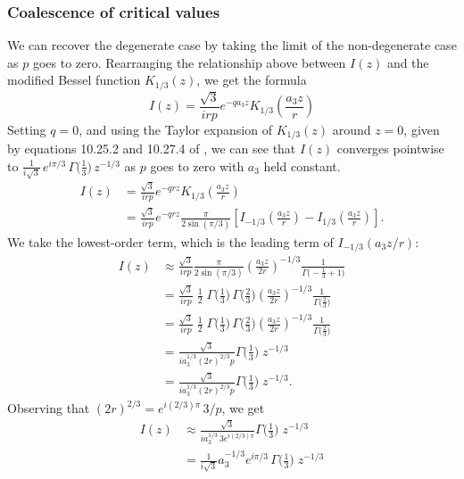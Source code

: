 \documentclass{article}
\theoremstyle{definition}
\theoremstyle{plain}
\newenvironment{verify}{\color{ForestGreen}}{\color{black}}
\begin{document}
\subsubsection{Coalescence of critical values}
We can recover the degenerate case by taking the limit of the non-degenerate case as $p$ goes to zero. Rearranging the relationship above between $I(z)$ and the modified Bessel function $K_{1/3}(z)$, we get the formula
\[ I(z) = \frac{\sqrt{3}}{irp} e^{-qa_3z} K_{1/3}\left(\frac{a_3 z}{r}\right) \]
Setting $q=0$, and using the Taylor expansion of $K_{1/3}(z)$ around $z = 0$, given by equations 10.25.2 and 10.27.4 of \cite{dlmf}, we can see that $I(z)$ converges pointwise to $\tfrac{1}{i\sqrt{3}}\,e^{i\pi/3}\,\Gamma\big(\tfrac{1}{3}\big)\,z^{-1/3}$ as $p$ goes to zero with $a_3$ held constant.
\begin{verify}
\begin{align*}
I(z) & = \frac{\sqrt{3}}{irp} e^{-qrz} K_{1/3}\left(\frac{a_3 z}{r}\right) \\
& = \frac{\sqrt{3}}{irp} e^{-qrz} \frac{\pi}{2 \sin(\pi/3)} \left[ I_{-1/3}\left(\frac{a_3 z}{r}\right) - I_{1/3}\left(\frac{a_3 z}{r} \right)\right].
\end{align*}
We take the lowest-order term, which is the leading term of $I_{-1/3}(a_3 z / r)$:
\begin{align*}
I(z) & \approx \frac{\sqrt{3}}{irp} \frac{\pi}{2 \sin(\pi/3)} \left(\frac{a_3 z}{2r}\right)^{-1/3} \frac{1}{\Gamma\big(-\tfrac{1}{3} + 1\big)} \\
& = \frac{\sqrt{3}}{irp}\;\frac{1}{2}\;\Gamma\big(\tfrac{1}{3}\big)\,\Gamma\big(\tfrac{2}{3}\big) \left(\frac{a_3 z}{2r}\right)^{-1/3} \frac{1}{\Gamma\big(\tfrac{2}{3}\big)} \\
& = \frac{\sqrt{3}}{irp}\;\frac{1}{2}\;\Gamma\big(\tfrac{1}{3}\big)\,\Gamma\big(\tfrac{2}{3}\big) \left(\frac{a_3 z}{2r}\right)^{-1/3} \frac{1}{\Gamma\big(\tfrac{2}{3}\big)} \\
& = \frac{\sqrt{3}}{i a_3^{1/3} (2r)^{2/3} p} \Gamma\big(\tfrac{1}{3}\big)\;z^{-1/3} \\
& = \frac{\sqrt{3}}{i a_3^{1/3} (2r)^{2/3} p} \Gamma\big(\tfrac{1}{3}\big)\;z^{-1/3}.
\end{align*}
Observing that $(2r)^{2/3} = e^{i(2/3)\pi }\,3/p$, we get
\begin{align*}
I(z) & \approx \frac{\sqrt{3}}{i a_3^{1/3}\,3e^{i(2/3)\pi}} \Gamma\big(\tfrac{1}{3}\big)\;z^{-1/3} \\
& = \frac{1}{i\sqrt{3}} a_3^{-1/3} e^{i\pi/3}\,\Gamma\big(\tfrac{1}{3}\big)\;z^{-1/3}
\end{align*}
\end{verify}
%
\end{document}
